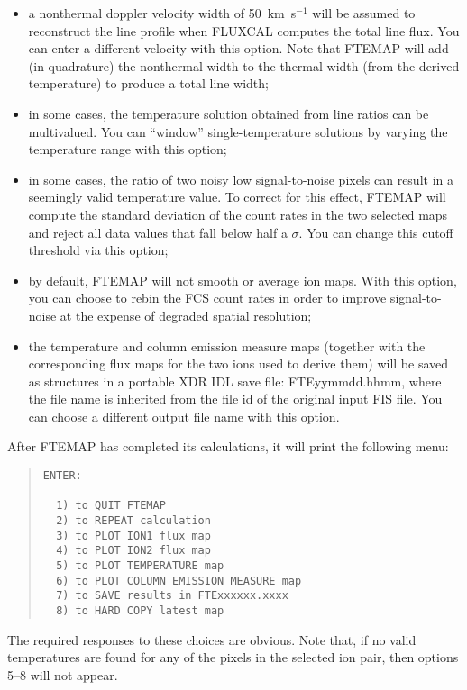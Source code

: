 {{{\begin{itemize}
\item a nonthermal doppler velocity width of 50~km~s$^{-1}$ will be
assumed to reconstruct the line profile when FLUXCAL computes the total line
flux. You can enter a different velocity with this option. Note that FTEMAP
will add (in quadrature) the nonthermal width to the thermal  width (from the
derived temperature) to produce a total line width;

\item in some cases, the temperature solution obtained from line ratios
can be multivalued. You can ``window'' single-temperature solutions by varying
the temperature range with this option;

\item in some cases, the ratio of two noisy low signal-to-noise pixels can
result in a seemingly valid temperature value. To correct for this effect,
FTEMAP will compute the standard deviation of the count rates in the two
selected maps and reject all data values that fall below half a $\sigma$. You
can change this cutoff threshold via this option;

\item by default, FTEMAP will not smooth or average ion maps. With this
option, you can choose to rebin the FCS count rates in order to improve
signal-to-noise at the expense of degraded spatial resolution;

\item the temperature and column emission measure maps (together with the
corresponding flux maps for the two ions used  to derive them) will be saved as
structures in a portable XDR IDL save file: FTEyymmdd.hhmm, where the file name
is inherited from the file id of the original input FIS file. You can choose a
different output file name with this option.
\end{itemize}

After FTEMAP has completed its calculations, it will print the following menu:
\begin{quote}
\begin{verbatim}
ENTER:

  1) to QUIT FTEMAP
  2) to REPEAT calculation
  3) to PLOT ION1 flux map
  4) to PLOT ION2 flux map
  5) to PLOT TEMPERATURE map
  6) to PLOT COLUMN EMISSION MEASURE map
  7) to SAVE results in FTExxxxxx.xxxx
  8) to HARD COPY latest map
\end{verbatim}
\end{quote}
The required responses to these choices are obvious. Note that, if no valid
temperatures are found for any of the pixels in the selected ion pair, then
options 5--8 will not appear.

}}}

